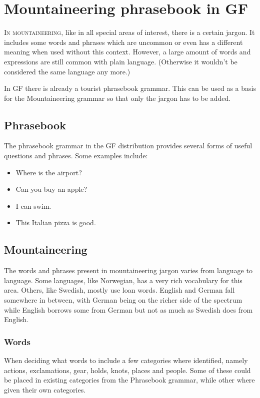 \chapter{Mountaineering phrasebook in GF}
\lettrine[lines=4, loversize=-0.1, lraise=0.1]{I}{n mountaineering}, like in all special areas of interest, there is a certain jargon. It includes some words and phrases which are uncommon or even has a different meaning when used without this context. However, a large amount of words and expressions are still common with plain language. (Otherwise it wouldn't be considered the same language any more.)

In GF there is already a tourist phrasebook grammar. This can be used as a basis for the Mountaineering grammar so that only the jargon has to be added.


\section{Phrasebook}
The phrasebook grammar in the GF distribution provides several forms of useful questions and phrases. Some examples include:
\begin{itemize}
\item Where is the airport?
\item Can you buy an apple?
\item I can swim.
\item This Italian pizza is good.
\end{itemize}


\section{Mountaineering}
The words and phrases present in mountaineering jargon varies from language to language. Some languages, like Norwegian, has a very rich vocabulary for this area. Others, like Swedish, mostly use loan words. English and German fall somewhere in between, with German being on the richer side of the spectrum while English borrows some from German but not as much as Swedish does from English.


\subsection{Words}
\label{sec:words}
When deciding what words to include a few categories where identified, namely actions, exclamations, gear, holds, knots, places and people. Some of these could be placed in existing categories from the Phrasebook grammar, while other where given their own categories.

